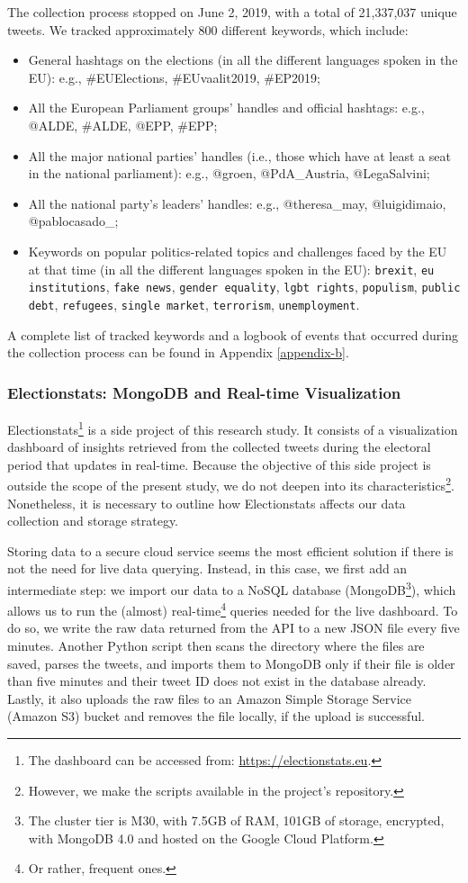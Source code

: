 The collection process stopped on June 2, 2019, with a total of 21,337,037 unique tweets. We tracked approximately 800 different keywords, which include:
\begin{itemize}
\item General hashtags on the elections (in all the different languages spoken in the EU): e.g., \#EUElections, \#EUvaalit2019, \#EP2019;
\item All the European Parliament groups' handles and official hashtags: e.g., @ALDE, \#ALDE, @EPP, \#EPP;
\item All the major national parties' handles (i.e., those which have at least a seat in the national parliament): e.g., @groen, @PdA\_Austria, @LegaSalvini;
\item All the national party's leaders' handles: e.g., @theresa\_may, @luigidimaio, @pablocasado\_;
\item Keywords on popular politics-related topics and challenges faced by the EU at that time (in all the different languages spoken in the EU): \texttt{brexit}, \texttt{eu institutions}, \texttt{fake news}, \texttt{gender equality}, \texttt{lgbt rights}, \texttt{populism}, \texttt{public debt}, \texttt{refugees}, \texttt{single market}, \texttt{terrorism}, \texttt{unemployment}.
\end{itemize}
A complete list of tracked keywords and a logbook of events that occurred during the collection process can be found in Appendix \vref{appendix-b}.
\subsubsection{Electionstats: MongoDB and Real-time Visualization}\label{electionstats}
Electionstats\footnote{The dashboard can be accessed from: \url{https://electionstats.eu}.} is a side project of this research study. It consists of a visualization dashboard of insights retrieved from the collected tweets during the electoral period that updates in real-time. Because the objective of this side project is outside the scope of the present study, we do not deepen into its characteristics\footnote{However, we make the scripts available in the project’s repository.}. Nonetheless, it is necessary to outline how Electionstats affects our data collection and storage strategy.

Storing data to a secure cloud service seems the most efficient solution if there is not the need for live data querying. Instead, in this case, we first add an intermediate step: we import our data to a NoSQL database (MongoDB\footnote{The cluster tier is M30, with 7.5GB of RAM, 101GB of storage, encrypted, with MongoDB 4.0 and hosted on the Google Cloud Platform.}), which allows us to run the (almost) real-time\footnote{Or rather, frequent ones.} queries needed for the live dashboard. To do so, we write the raw data returned from the API to a new JSON file every five minutes. Another Python script then scans the directory where the files are saved, parses the tweets, and imports them to MongoDB only if their file is older than five minutes and their tweet ID does not exist in the database already. Lastly, it also uploads the raw files to an Amazon Simple Storage Service (Amazon S3) bucket and removes the file locally, if the upload is successful.

